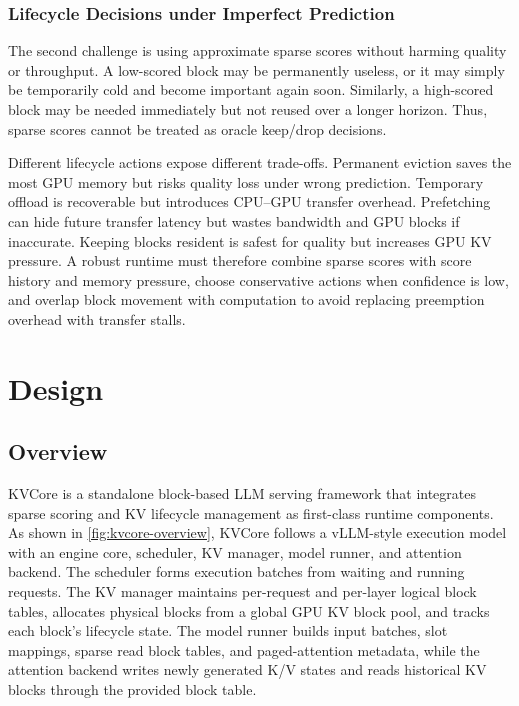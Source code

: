 \documentclass[sigplan,10pt,review,anonymous]{acmart}
\begin{document}
\subsubsection{Lifecycle Decisions under Imperfect Prediction}

The second challenge is using approximate sparse scores without harming quality or throughput.
A low-scored block may be permanently useless, or it may simply be temporarily cold and become important again soon.
Similarly, a high-scored block may be needed immediately but not reused over a longer horizon.
Thus, sparse scores cannot be treated as oracle keep/drop decisions.

Different lifecycle actions expose different trade-offs.
Permanent eviction saves the most GPU memory but risks quality loss under wrong prediction.
Temporary offload is recoverable but introduces CPU--GPU transfer overhead.
Prefetching can hide future transfer latency but wastes bandwidth and GPU blocks if inaccurate.
Keeping blocks resident is safest for quality but increases GPU KV pressure.
A robust runtime must therefore combine sparse scores with score history and memory pressure, choose conservative actions when confidence is low, and overlap block movement with computation to avoid replacing preemption overhead with transfer stalls.



\section{Design}
\label{sec:design}

\subsection{Overview}

KVCore is a standalone block-based LLM serving framework that integrates sparse scoring and KV lifecycle management as first-class runtime components.
As shown in \autoref{fig:kvcore-overview}, KVCore follows a vLLM-style execution model with an engine core, scheduler, KV manager, model runner, and attention backend.
The scheduler forms execution batches from waiting and running requests.
The KV manager maintains per-request and per-layer logical block tables, allocates physical blocks from a global GPU KV block pool, and tracks each block's lifecycle state.
The model runner builds input batches, slot mappings, sparse read block tables, and paged-attention metadata, while the attention backend writes newly generated K/V states and reads historical KV blocks through the provided block table.
\end{document}
